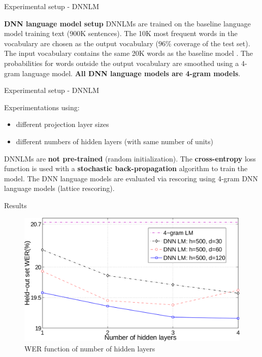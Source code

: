 \documentclass{beamer}
\begin{document}
\begin{frame}{Experimental setup - \small{DNNLM}}

\textbf{DNN language model setup}
\newline
\newline
DNNLMs are trained on the baseline language model training text (900K sentences).
\newline
\newline
The 10K most frequent words in the vocabulary are chosen as the output vocabulary ($96\%$ coverage of the test set).
\newline
The input vocabulary contains the same 20K words as the baseline model	.
\newline
\newline
The probabilities for words outside the output vocabulary are smoothed using a 4-gram language model.
\newline
\newline
\textbf{All DNN language models are 4-gram models}.
\end{frame}

\begin{frame}{Experimental setup - \small{DNNLM}}

Experimentations using:
\begin{itemize}
	\item different projection layer sizes
	\item different numbers of hidden layers (with same number of units)
\end{itemize}

\bigskip
DNNLMs are \textbf{not pre-trained} (random initialization).
\newline
\newline
The \textbf{cross-entropy} loss function is used with a \textbf{stochastic back-propagation} algorithm to train the model.
\newline
\newline
The DNN language models are evaluated via rescoring using 4-gram DNN language models (lattice rescoring).

\end{frame}

\begin{frame}{Results}
	\begin{figure}[!htb]
		\centering
	    \includegraphics[width=0.8\linewidth]{./images/results1.png}
	    \caption{WER function of number of hidden layers}
	\end{figure}
\end{frame}
\end{document}

